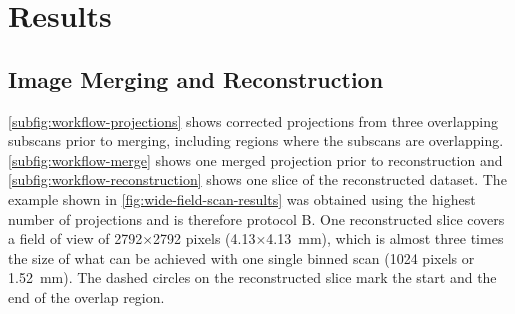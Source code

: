 \section{Results}\label{sec:Results}
\subsection{Image Merging and Reconstruction}\label{sec:Image Merging and Reconstruction}
\autoref{subfig:workflow-projections} shows corrected projections from three overlapping subscans prior to merging, including regions where the subscans are overlapping. \autoref{subfig:workflow-merge} shows one merged projection prior to reconstruction and \autoref{subfig:workflow-reconstruction} shows one slice of the reconstructed dataset. The example shown in \autoref{fig:wide-field-scan-results} was obtained using the highest number of projections and is therefore protocol B. One reconstructed slice covers a field of view of 2792$\times$2792 pixels (4.13$\times$\SI{4.13}{\milli\meter}), which is almost three times the size of what can be achieved with one single binned scan (1024 pixels or \SI{1.52}{\milli\meter}). %
The dashed circles on the reconstructed slice mark the start and the end of the overlap region.

